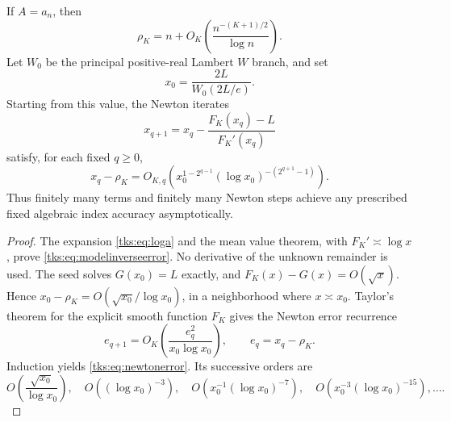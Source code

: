 \begin{proposition}\label{tks:prop:inverse}
If $A=a_n$, then
\begin{equation}\label{tks:eq:modelinverseerror}
\rho_K=n+O_K\left(\frac{n^{-(K+1)/2}}{\log n}\right).
\end{equation}
Let $W_0$ be the principal positive-real Lambert $W$ branch, and set
\begin{equation}\label{tks:eq:Wseed}
x_0=\frac{2L}{W_0(2L/e)}.
\end{equation}
Starting from this value, the Newton iterates
\begin{equation}\label{tks:eq:newton}
x_{q+1}=x_q-\frac{F_K(x_q)-L}{F_K'(x_q)}
\end{equation}
satisfy, for each fixed $q\geq0$,
\begin{equation}\label{tks:eq:newtonerror}
x_q-\rho_K
 =O_{K,q}\left(
 x_0^{1-2^{q-1}}(\log x_0)^{-(2^{q+1}-1)}\right).
\end{equation}
Thus finitely many terms and finitely many Newton steps achieve any prescribed fixed algebraic index accuracy asymptotically.
\end{proposition}
\begin{proof}
The expansion \eqref{tks:eq:loga} and the mean value theorem, with $F_K'\asymp\log x$, prove \eqref{tks:eq:modelinverseerror}. No derivative of the unknown remainder is used. The seed solves $G(x_0)=L$ exactly, and $F_K(x)-G(x)=O(\sqrt x)$. Hence $x_0-\rho_K=O(\sqrt{x_0}/\log x_0)$, in a neighborhood where $x\asymp x_0$. Taylor's theorem for the explicit smooth function $F_K$ gives the Newton error recurrence
\[
e_{q+1}=O_K\left(\frac{e_q^2}{x_0\log x_0}\right),
\qquad e_q=x_q-\rho_K.
\]
Induction yields \eqref{tks:eq:newtonerror}. Its successive orders are
\[
O\left(\frac{\sqrt{x_0}}{\log x_0}\right),\quad
O((\log x_0)^{-3}),\quad
O(x_0^{-1}(\log x_0)^{-7}),\quad
O(x_0^{-3}(\log x_0)^{-15}),\ldots.
\]
\end{proof}

